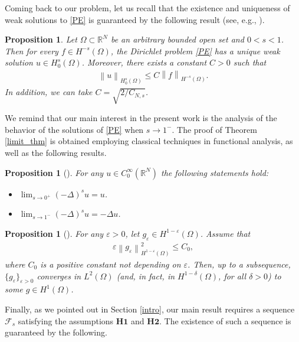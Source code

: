 \documentclass[reqno,twoside]{amsart}
\newtheorem{proposition}[theorem]{Proposition}
\numberwithin{equation}{section}
\def\RR{{\mathbb{R}}}
\newcommand{\norm}[2]{{\left\|#1\right\|}_{#2}}
\newcommand{\fl}[2]{(-\Delta)^#1#2}
\newcommand{\cns}{C_{N,s}}
\begin{document}
Coming back to our problem, let us recall that the existence and uniqueness of weak solutions to \eqref{PE} is guaranteed by the following result (see, e.g., \cite[Proposition 1.2.23]{peradottolaplaciano}).

\begin{proposition}\label{prop-ex}
Let $\Omega\subset\RR^N$ be an arbitrary bounded open set and $0<s<1$. Then for every $f\in H^{-s}(\Omega)$, the Dirichlet problem \eqref{PE} has a unique weak solution $u\in H_0^s(\Omega)$. Moreover, there exists a constant $C>0$ such that
\begin{align}\label{est-sol}
	\norm{u}{H_0^s(\Omega)}\le C\norm{f}{H^{-s}(\Omega)}.
\end{align}
In addition, we can take $C=\sqrt{2/\cns}$. 
\end{proposition}

We remind that our main interest in the present work is the analysis of the behavior of the solutions of \eqref{PE} when $s\to 1^-$. The proof of Theorem \ref{limit_thm} is obtained employing classical techniques in functional analysis, as well as the following results.

\begin{proposition}[{\cite[Proposition 4.4]{dihitchhiker}}]\label{limit_prop}
For any $u\in C_0^\infty(\RR^N)$ the following statements hold:
\begin{itemize}
	\item[(i)] $\lim_{s\to 0^+}\fl{s}{u} = u$.
	\item[(ii)] $\lim_{s\to 1^-} \fl{s}{u} = -\Delta u$.
\end{itemize}
\end{proposition}

\begin{proposition}[{\cite[Corollary 7]{bourgain2001another}}]\label{brezis_prop}
For any $\varepsilon>0$, let $g_\varepsilon \in H^{1-\varepsilon}(\Omega)$. Assume that 
\begin{align*}
	\varepsilon\norm{g_\varepsilon}{H^{1-\varepsilon}(\Omega)}^2\leq C_0,
\end{align*}
where $C_0$ is a positive constant not depending on $\varepsilon$. Then, up to a subsequence, $\{g_\varepsilon\}_{\varepsilon>0}$ converges in $L^2(\Omega)$ (and, in fact, in $H^{1-\delta}(\Omega)$, for all $\delta > 0$) to some $g\in H^1(\Omega)$.
\end{proposition}

Finally, as we pointed out in Section \ref{intro}, our main result requires a sequence $\mathcal{F}_s$ satisfying the assumptions $\textbf{H1}$ and $\textbf{H2}$. The existence of such a sequence is guaranteed by the following.
\end{document}
